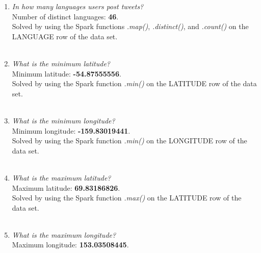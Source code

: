 \documentclass{article}
\begin{document}
\begin{enumerate}[label=\alph*)]
    
    \item \textit{In how many languages users post tweets?}\\
    
    Number of distinct languages: \textbf{46}.\\
    
    Solved by using the Spark functions \textit{.map()}, \textit{.distinct()}, and \textit{.count()} on the LANGUAGE row of the data set.\\ \\
    
    
    \item \textit{What is the minimum latitude?}\\
    
    Minimum latitude: \textbf{-54.87555556}.\\
    
    Solved by using the Spark function \textit{.min()} on the LATITUDE row of the data set.\\ \\
    
    
    \item \textit{What is the minimum longitude?}\\
    
    Minimum longitude: \textbf{-159.83019441}.\\
    
    Solved by using the Spark function \textit{.min()} on the LONGITUDE row of the data set.\\ \\
    
    
    \item \textit{What is the maximum latitude?}\\
    
    Maximum latitude: \textbf{69.83186826}.\\
    
    Solved by using the Spark function \textit{.max()} on the LATITUDE row of the data set.\\ \\
    
    
    \item \textit{What is the maximum longitude?}\\
    
    Maximum longitude: \textbf{153.03508445}.\\
    

\end{enumerate}
\end{document}
